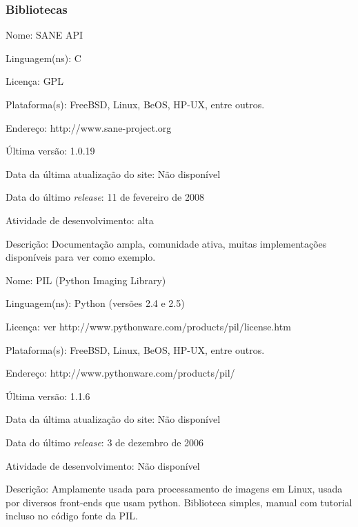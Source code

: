 \subsubsection{Bibliotecas}

\begin{description*}
	\item[Nome:] SANE API
	\item[Linguagem(ns):] C
	\item[Licença:] GPL
	\item[Plataforma(s):] FreeBSD, Linux, BeOS, HP-UX, entre outros.
	\item[Endereço:] http://www.sane-project.org
	\item[Última versão:] 1.0.19
	\item[Data da última atualização do site:] Não disponível
	\item[Data do último {\it release}:] 11 de fevereiro de 2008
	\item[Atividade de desenvolvimento:] alta
	\item[Descrição:] 
	Documentação ampla, comunidade ativa, muitas implementações disponíveis para ver como exemplo.
\end{description*}

\begin{description*}
	\item[Nome:] PIL (Python Imaging Library)
	\item[Linguagem(ns):] Python (versões 2.4 e 2.5)
	\item[Licença:] ver http://www.pythonware.com/products/pil/license.htm
	\item[Plataforma(s):] FreeBSD, Linux, BeOS, HP-UX, entre outros.
	\item[Endereço:] http://www.pythonware.com/products/pil/
	\item[Última versão:] 1.1.6
	\item[Data da última atualização do site:] Não disponível
	\item[Data do último {\it release}:] 3 de dezembro de 2006
	\item[Atividade de desenvolvimento:] Não disponível
	\item[Descrição:] 
	Amplamente usada para processamento de imagens em Linux, usada por diversos front-ends que usam python. Biblioteca simples, manual com tutorial incluso no código fonte da PIL.
\end{description*}


